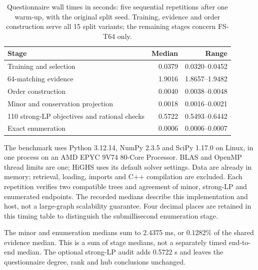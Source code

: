 \begin{table}[htbp]\centering\small\caption{Questionnaire wall times in seconds: five sequential repetitions after one warm-up, with the original split seed. Training, evidence and order construction serve all 15 split variants; the remaining stages concern FS-T64 only.}\label{tab:questionnaire-timing}\begin{tabular}{lrr}\toprule Stage & Median & Range\\\midrule

Training and selection & 0.0379 & 0.0320--0.0452\\

64-matching evidence & 1.9016 & 1.8657--1.9482\\

Order construction & 0.0040 & 0.0038--0.0048\\

Minor and conservation projection & 0.0018 & 0.0016--0.0021\\

110 strong-LP objectives and rational checks & 0.5722 & 0.5493--0.6442\\

Exact enumeration & 0.0006 & 0.0006--0.0007\\

\bottomrule\end{tabular}\end{table}

The benchmark uses Python 3.12.14, NumPy 2.3.5 and SciPy 1.17.0 on Linux, in one process on an AMD EPYC 9V74 80-Core Processor. BLAS and OpenMP thread limits are one; HiGHS uses its default solver settings. Data are already in memory; retrieval, loading, imports and C++ compilation are excluded. Each repetition verifies two compatible trees and agreement of minor, strong-LP and enumerated endpoints. The recorded medians describe this implementation and host, not a large-graph scalability guarantee. Four decimal places are retained in this timing table to distinguish the submillisecond enumeration stage.

The minor and enumeration medians sum to 2.4375 ms, or 0.1282\% of the shared evidence median. This is a sum of stage medians, not a separately timed end-to-end median. The optional strong-LP audit adds 0.5722 s and leaves the questionnaire degree, rank and hub conclusions unchanged.

